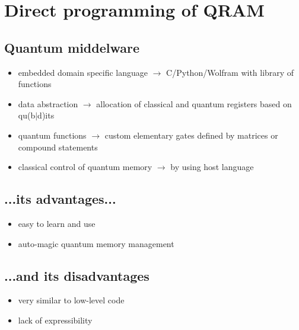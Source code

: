 \documentclass{beamer}
\begin{document}
\section{Direct programming of QRAM}

\subsection{Quantum middelware}
\begin{frame}{\insertsection}{\insertsubsection}
	\begin{itemize}
		\item embedded domain specific language $\rightarrow$ 
		C/Python/Wolfram 
		with library of functions
		\item data abstraction $\rightarrow$ allocation of classical and quantum registers based on qu(b$|$d)its
		\item quantum functions $\rightarrow$ custom elementary gates defined by matrices or compound statements
		\item classical control of quantum memory $\rightarrow$ by using host language
	\end{itemize}
\end{frame}

\subsection{...its advantages...}
\begin{frame}{\insertsection}{\insertsubsection}
	\begin{itemize}
        \item<1-> easy to learn and use
		\item<2-> auto-magic quantum memory management
	\end{itemize}
\end{frame}

\subsection{...and its disadvantages}
\begin{frame}{\insertsection}{\insertsubsection}
    \begin{itemize}
        \item very similar to low-level code
        \item lack of expressibility
    \end{itemize}
\end{frame}
\end{document}
